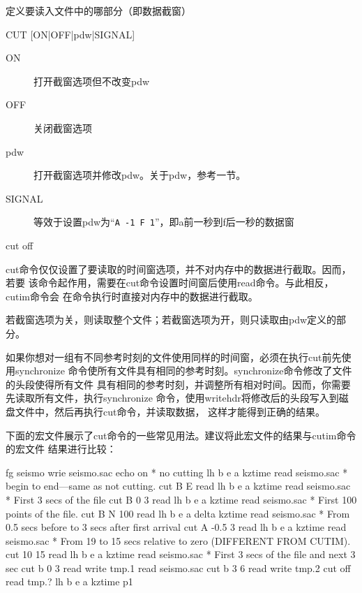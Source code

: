 \label{cmd:cut}

定义要读入文件中的哪部分（即数据截窗）

\begin{SACSTX}
CUT [ON|OFF|pdw|SIGNAL]
\end{SACSTX}

\begin{description}
\item [ON] 打开截窗选项但不改变pdw
\item [OFF] 关闭截窗选项
\item [pdw] 打开截窗选项并修改pdw。关于pdw，参考一节。
\item [SIGNAL] 等效于设置pdw为``\verb+A -1 F 1+''，即a前一秒到f后一秒的数据窗
\end{description}

\begin{SACDFT}
cut off
\end{SACDFT}

cut命令仅仅设置了要读取的时间窗选项，并不对内存中的数据进行截取。因而，若要
该命令起作用，需要在cut命令设置时间窗后使用read命令。与此相反，cutim命令会
在命令执行时直接对内存中的数据进行截取。

若截窗选项为关，则读取整个文件；若截窗选项为开，则只读取由pdw定义的部分。

如果你想对一组有不同参考时刻的文件使用同样的时间窗，必须在执行cut前先使用synchronize
命令使所有文件具有相同的参考时刻。synchronize命令修改了文件的头段使得所有文件
具有相同的参考时刻，并调整所有相对时间。因而，你需要先读取所有文件，执行synchronize
命令，使用writehdr将修改后的头段写入到磁盘文件中，然后再执行cut命令，并读取数据，
这样才能得到正确的结果。

下面的宏文件展示了cut命令的一些常见用法。建议将此宏文件的结果与cutim命令的宏文件
结果进行比较：
\begin{SACCode}
fg seismo
wrie seismo.sac
echo on
* no cutting
lh b e a kztime
read seismo.sac
* begin to end---same as not cutting.
cut B E
read
lh b e a kztime
read seismo.sac
* First 3 secs of the file
cut B 0 3
read
lh b e a kztime
read seismo.sac
* First 100 points of the file.
cut B N 100
read
lh b e a delta kztime
read seismo.sac
* From 0.5 secs before to 3 secs after first arrival
cut A -0.5 3
read
lh b e a kztime
read seismo.sac
* From 19 to 15 secs relative to zero (DIFFERENT FROM CUTIM).
cut 10 15
read
lh b e a kztime
read seismo.sac
* First 3 secs of the file and next 3 sec
cut b 0 3
read
write tmp.1
read seismo.sac
cut b 3 6
read
write tmp.2
cut off
read tmp.?
lh b e a kztime
p1
\end{SACCode}

